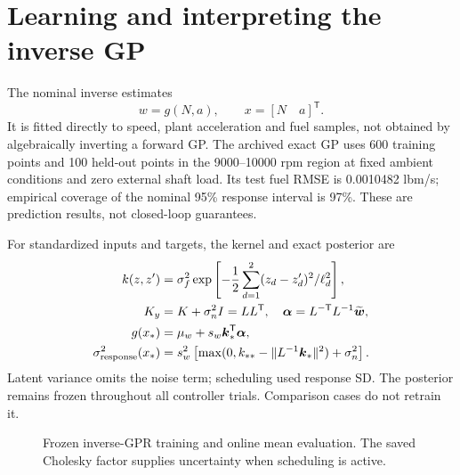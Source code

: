 \documentclass[11pt,a4paper]{article}
\begin{document}
\section{Learning and interpreting the inverse GP}
The nominal inverse estimates
\begin{equation}w=g(N,a),\qquad x=[N\quad a]^{\mathsf T}.\end{equation}
It is fitted directly to speed, plant acceleration and fuel samples, not obtained by algebraically inverting a forward GP. The archived exact GP uses 600 training points and 100 held-out points in the 9000--10000 rpm region at fixed ambient conditions and zero external shaft load. Its test fuel RMSE is 0.0010482 lbm/s; empirical coverage of the nominal 95\% response interval is 97\%. These are prediction results, not closed-loop guarantees.

For standardized inputs and targets, the kernel and exact posterior are~\cite{gpml}
\begin{align}
k(z,z')&=\sigma_f^2\exp\left[-\frac12\sum_{d=1}^2(z_d-z'_d)^2/\ell_d^2\right],\\
K_y&=K+\sigma_n^2I=LL^{\mathsf T},\quad
\boldsymbol\alpha=L^{-\mathsf T}L^{-1}\widetilde{\boldsymbol w},\\
g(x_*)&=\mu_w+s_w\boldsymbol k_*^{\mathsf T}\boldsymbol\alpha,\\
\sigma_{\rm response}^2(x_*)&=s_w^2\left[\max(0,k_{**}-\|L^{-1}\boldsymbol k_*\|^2)+\sigma_n^2\right].
\label{eq:gpvar}
\end{align}
Latent variance omits the noise term; scheduling used response SD. The posterior remains frozen throughout all controller trials. Comparison cases do not retrain it.
\begin{figure}[H]\centering{}\caption{Frozen inverse-GPR training and online mean evaluation. The saved Cholesky factor supplies uncertainty when scheduling is active.}\end{figure}
\end{document}
